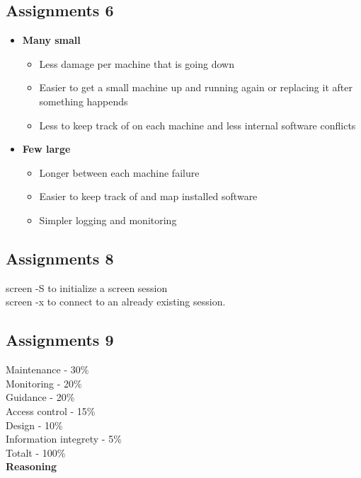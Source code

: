 \subsection{Assignments 6} 
 \begin{itemize}
	\item \textbf{Many small}
		\begin{itemize}
			\item Less damage per machine that is going down
			\item Easier to get a small machine up and running again or replacing it after something happends
			\item Less to keep track of on each machine and less internal software conflicts
		\end{itemize}
	\item \textbf{Few large}
		\begin{itemize}
			\item Longer between each machine failure
			\item Easier to keep track of and map installed software
			\item Simpler logging and monitoring
		\end{itemize}
\end{itemize}

\subsection{Assignments 8} 
screen -S  to initialize a screen session\\
screen -x to connect to an already existing session.

\subsection{Assignments 9} 
Maintenance - 30\% \\
Monitoring - 20\% \\
Guidance  - 20\% \\
Access control - 15\% \\
Design - 10\% \\
Information integrety  - 5\% \\
Totalt	    - 100\% \\

\textbf{Reasoning}

